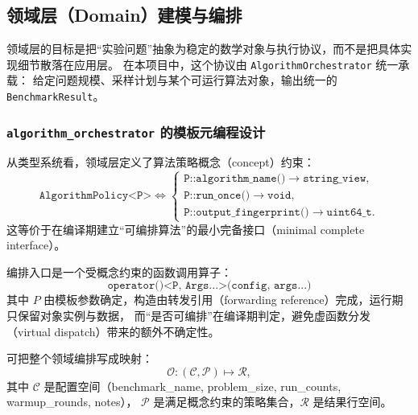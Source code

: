 \subsection{领域层（Domain）建模与编排}

领域层的目标是把“实验问题”抽象为稳定的数学对象与执行协议，而不是把具体实现细节散落在应用层。
在本项目中，这个协议由 \texttt{AlgorithmOrchestrator} 统一承载：
给定问题规模、采样计划与某个可运行算法对象，输出统一的 \texttt{BenchmarkResult}。

\subsubsection{\texttt{algorithm\_orchestrator} 的模板元编程设计}

从类型系统看，领域层定义了算法策略概念（concept）约束：
\begin{equation}
\texttt{AlgorithmPolicy<P>} \iff
\begin{cases}
\texttt{P::algorithm\_name()} \to \texttt{string\_view},\\
\texttt{P::run\_once()} \to \texttt{void},\\
\texttt{P::output\_fingerprint()} \to \texttt{uint64\_t}.
\end{cases}
\end{equation}
这等价于在编译期建立“可编排算法”的最小完备接口（minimal complete interface）。

编排入口是一个受概念约束的函数调用算子：
\begin{equation}
\texttt{operator()<P, Args...>(config, args...)}
\end{equation}
其中 \(P\) 由模板参数确定，构造由转发引用（forwarding reference）完成，运行期只保留对象实例与数据，
而“是否可编排”在编译期判定，避免虚函数分发（virtual dispatch）带来的额外不确定性。

可把整个领域编排写成映射：
\begin{equation}
\mathcal{O}: (\mathcal{C}, \mathcal{P}) \mapsto \mathcal{R},
\end{equation}
其中 \(\mathcal{C}\) 是配置空间（benchmark\_name, problem\_size, run\_counts, warmup\_rounds, notes），
\(\mathcal{P}\) 是满足概念约束的策略集合，\(\mathcal{R}\) 是结果行空间。

